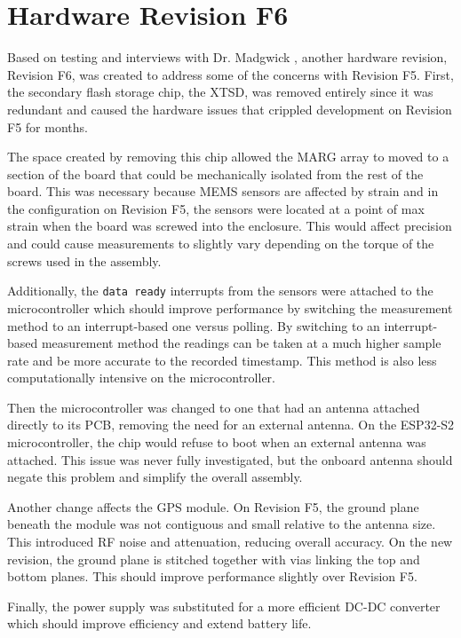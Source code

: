 \section{Hardware Revision F6} 
Based on testing and interviews with Dr. Madgwick \cite{Duffy:2023}, another hardware revision, Revision F6, was created to address some of the concerns with Revision F5.
First, the secondary flash storage chip, the XTSD, was removed entirely since it was redundant and caused the hardware issues that crippled development on Revision F5 for months.

The space created by removing this chip allowed the MARG array to moved to a section of the board that could be mechanically isolated from the rest of the board.
This was necessary because MEMS sensors are affected by strain and in the configuration on Revision F5, the sensors were located at a point of max strain when the board was screwed into the enclosure.
This would affect precision and could cause measurements to slightly vary depending on the torque of the screws used in the assembly.

Additionally, the \lstinline[style=customInline]|data ready| interrupts from the sensors were attached to the microcontroller which should improve performance by switching the measurement method to an interrupt-based one versus polling.
By switching to an interrupt-based measurement method the readings can be taken at a much higher sample rate and be more accurate to the recorded timestamp.
This method is also less computationally intensive on the microcontroller.

Then the microcontroller was changed to one that had an antenna attached directly to its PCB, removing the need for an external antenna.
On the ESP32-S2 microcontroller, the chip would refuse to boot when an external antenna was attached.
This issue was never fully investigated, but the onboard antenna should negate this problem and simplify the overall assembly.

Another change affects the GPS module.
On Revision F5, the ground plane beneath the module was not contiguous and small relative to the antenna size.
This introduced RF noise and attenuation, reducing overall accuracy.
On the new revision, the ground plane is stitched together with vias linking the top and bottom planes.
This should improve performance slightly over Revision F5.

Finally, the power supply was substituted for a more efficient DC-DC converter which should improve efficiency and extend battery life.

